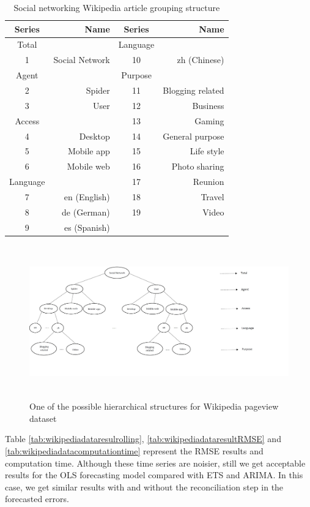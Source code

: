 \documentclass[11pt,a4paper,]{article}
\begin{document}
\begin{table}[t]

\caption{\label{tab:wikipediagroupingstructure}Social networking Wikipedia article grouping structure}
\centering
\begin{tabular}{crcr}
\toprule
Series & Name & Series & Name\\
\midrule
Total &  & Language & \\
1 & Social Network & 10 & zh (Chinese)\\
Agent &  & Purpose & \\
2 & Spider & 11 & Blogging related\\
3 & User & 12 & Business\\
Access &  & 13 & Gaming\\
4 & Desktop & 14 & General purpose\\
5 & Mobile app & 15 & Life style\\
6 & Mobile web & 16 & Photo sharing\\
Language &  & 17 & Reunion\\
7 & en (English) & 18 & Travel\\
8 & de (German) & 19 & Video\\
9 & es (Spanish) &  & \\
\bottomrule
\end{tabular}
\end{table}

\begin{figure}

{\centering \includegraphics[width=500px,height=250px]{Paper-Figures/Wiki_group_structure} 

}

\caption{One of the possible hierarchical structures for Wikipedia pageview dataset}\label{fig:wikigroupstructure}
\end{figure}

Table \ref{tab:wikipediadataresulrolling}, \ref{tab:wikipediadataresultRMSE} and \ref{tab:wikipediadatacomputationtime} represent the RMSE results and computation time. Although these time series are noisier, still we get acceptable results for the OLS forecasting model compared with ETS and ARIMA. In this case, we get similar results with and without the reconciliation step in the forecasted errors.
\end{document}
